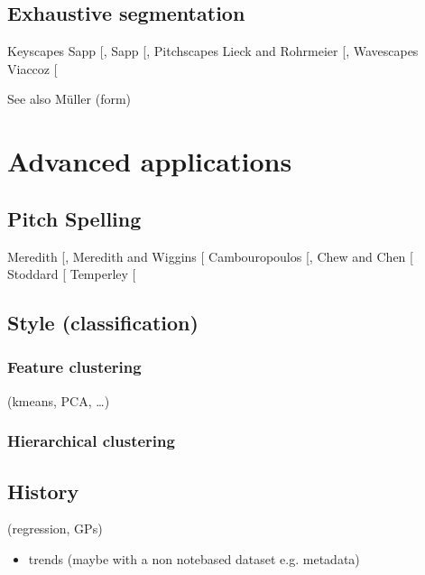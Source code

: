 \documentclass[letterpaper,10pt,english]{sphinxmanual}
\begin{document}
\section{Exhaustive segmentation}
\label{\detokenize{5_segmentation:exhaustive-segmentation}}
Keyscapes Sapp {[}\sphinxcite{8_bibliography:id15}{]}, Sapp {[}\sphinxcite{8_bibliography:id16}{]},
Pitchscapes Lieck and Rohrmeier {[}\sphinxcite{8_bibliography:id14}{]},
Wavescapes Viaccoz  {[}\sphinxcite{8_bibliography:id17}{]}

See also Müller (form)


\chapter{Advanced applications}
\label{\detokenize{6_advanced:advanced-applications}}\label{\detokenize{6_advanced::doc}}

\section{Pitch Spelling}
\label{\detokenize{6_advanced:pitch-spelling}}\label{\detokenize{6_advanced:id1}}
Meredith {[}\sphinxcite{8_bibliography:id9}{]}, Meredith and Wiggins {[}\sphinxcite{8_bibliography:id8}{]}
Cambouropoulos {[}\sphinxcite{8_bibliography:id10}{]}, Chew and Chen {[}\sphinxcite{8_bibliography:id11}{]}
Stoddard  {[}\sphinxcite{8_bibliography:id12}{]}
Temperley {[}\sphinxcite{8_bibliography:id13}{]}


\section{Style (classification)}
\label{\detokenize{6_advanced:style-classification}}

\subsection{Feature clustering}
\label{\detokenize{6_advanced:feature-clustering}}
(k\sphinxhyphen{}means, PCA, …)


\subsection{Hierarchical clustering}
\label{\detokenize{6_advanced:hierarchical-clustering}}

\section{History}
\label{\detokenize{6_advanced:history}}
(regression, GPs)
\begin{itemize}
\item {} 
trends (maybe with a non note\sphinxhyphen{}based dataset e.g. metadata)

\end{itemize}
\end{document}
